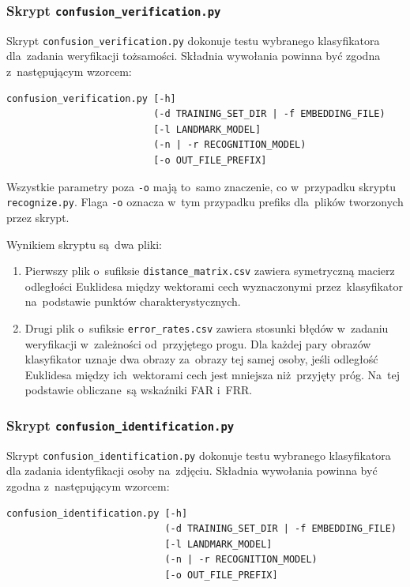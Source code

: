 \documentclass[11pt,a4paper]{article}
\begin{document}
\subsubsection{Skrypt \texttt{confusion\_verification.py}}

Skrypt \texttt{confusion\_verification.py} dokonuje testu wybranego klasyfikatora dla~zadania weryfikacji tożsamości.
Składnia wywołania powinna być zgodna z~następującym wzorcem:

\begin{minipage}{\linewidth}
\begin{verbatim}
confusion_verification.py [-h]
                          (-d TRAINING_SET_DIR | -f EMBEDDING_FILE)
                          [-l LANDMARK_MODEL]
                          (-n | -r RECOGNITION_MODEL)
                          [-o OUT_FILE_PREFIX]
\end{verbatim}
\end{minipage}

Wszystkie parametry poza \verb+-o+ mają to~samo znaczenie, co w~przypadku skryptu \texttt{recognize.py}.
Flaga \verb+-o+ oznacza w~tym przypadku prefiks dla~plików tworzonych przez skrypt.

Wynikiem skryptu są~dwa pliki:
\begin{enumerate}
    \item Pierwszy plik o~sufiksie \verb+distance_matrix.csv+ zawiera symetryczną macierz odległości Euklidesa między wektorami cech wyznaczonymi przez~klasyfikator na~podstawie punktów charakterystycznych.
    \item Drugi plik o~sufiksie \verb+error_rates.csv+ zawiera stosunki błędów w~zadaniu weryfikacji w~zależności od~przyjętego progu.
        Dla każdej pary obrazów klasyfikator uznaje dwa obrazy za~obrazy tej samej osoby, jeśli odległość Euklidesa między ich~wektorami cech jest mniejsza niż~przyjęty próg.
        Na~tej podstawie obliczane~są wskaźniki FAR i~FRR.
\end{enumerate}

\subsubsection{Skrypt \texttt{confusion\_identification.py}}

Skrypt \texttt{confusion\_identification.py} dokonuje testu wybranego klasyfikatora dla zadania identyfikacji osoby na~zdjęciu.
Składnia wywołania powinna być zgodna z~następującym wzorcem:

\begin{minipage}{\linewidth}
\begin{verbatim}
confusion_identification.py [-h]
                            (-d TRAINING_SET_DIR | -f EMBEDDING_FILE)
                            [-l LANDMARK_MODEL]
                            (-n | -r RECOGNITION_MODEL)
                            [-o OUT_FILE_PREFIX]
\end{verbatim}
\end{minipage}
\end{document}
